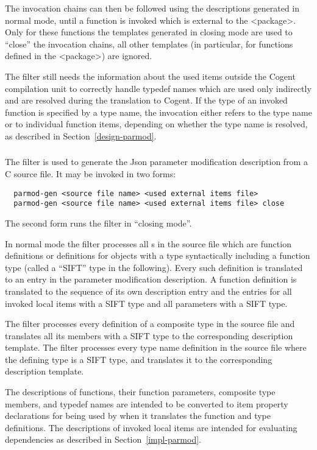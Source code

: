 The invocation chains can then be followed using the descriptions generated in normal mode, until a function is invoked
which is external to the <package>. Only for these functions the templates generated in closing mode are used
to ``close'' the invocation chains, all other templates (in particular, for functions defined in the <package>)
are ignored.

The filter still needs the information about the used items outside the Cogent compilation unit to correctly handle
typedef names which are used only indirectly and are resolved during the translation to Cogent. If the type of an
invoked function is specified by a type name, the invocation either refers to the type name or to individual function items,
depending on whether the type name is resolved, as described in Section~\ref{design-parmod}.

\subsubsection{}

The filter  is used to generate the Json parameter modification description from a C source file.
It may be invoked in two forms:
\begin{verbatim}
  parmod-gen <source file name> <used external items file>
  parmod-gen <source file name> <used external items file> close
\end{verbatim}
The second form runs the filter in ``closing mode''.

In normal mode the filter processes all s in the source file which are function
definitions or definitions for objects with a type syntactically including a function type (called a ``SIFT'' 
type in the following). Every such definition is translated to an
entry in the parameter modification description. A function definition is translated to the sequence of its
own description entry and the entries for all invoked local items with a SIFT type and all parameters with 
a SIFT type.

The filter processes every definition of a composite type in the source file and translates all
its members with a SIFT type to the corresponding
description template. The filter processes every type name definition in the source file where the defining type
is a SIFT type, and translates it to the corresponding description template.

The descriptions of functions, their function parameters, composite type members, and typedef names are 
intended to be converted to item property declarations for being used by 
when it translates the function and type definitions. The descriptions of invoked local items 
are intended for evaluating dependencies as described in Section~\ref{impl-parmod}.

